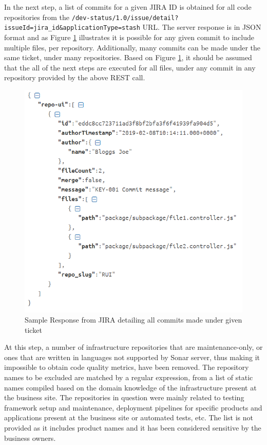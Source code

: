 In the next step, a list of commits for a given JIRA ID is obtained for all code repositories from the \texttt{/dev-status/1.0/issue/detail?issueId={jira_id}&applicationType=stash} URL. The server response is in JSON format and as Figure \ref{fig:source-code:jira:commit-response} illustrates it is possible for any given commit to include multiple files, per repository. Additionally, many commits can be made under the same ticket, under many repositories. Based on Figure \ref{fig:source-code:jira:commit-response}, it should be assumed that the all of the next steps are executed for all files, under any commit in any repository provided by the above REST call.
\begin{figure}[!h]
    \centering
    \includegraphics[scale=0.7]{Figures/gatherer/jira_connector_getting_commit_files_response.PNG}
    \caption{Sample Response from JIRA detailing all commits made under given ticket}
    \label{fig:source-code:jira:commit-response}
    
\end{figure}
    
At this step, a number of infrastructure repositories that are maintenance-only, or ones that are written in languages not supported by Sonar server, thus making it impossible to obtain code quality metrics, have been removed. The repository names to be excluded are matched by a regular expression, from a list of static names compiled based on the domain knowledge of the infrastructure present at the business site. The repositories in question were mainly related to testing framework setup and maintenance, deployment pipelines for specific products and applications present at the business site or automated tests, etc. The list is not provided as it includes product names and it has been considered sensitive by the business owners.
    
